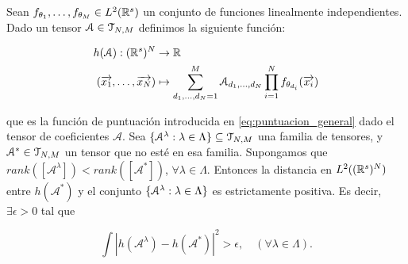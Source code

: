 \begin{lema} \label{lema:lema_previo_corolario}
    Sean $f_{\theta_1}, \ldots, f_{\theta_M} \in L^2(\mathbb{R}^s)$ un conjunto de funciones linealmente independientes. Dado un tensor $\mathcal{A} \in \mathcal{T}_{N, M}$ definimos la siguiente función:

    \begin{equation}
    \begin{split}
        h(\mathcal{A}): (\mathbb{R}^s)^N &\to \mathbb{R} \\
        (\overrightarrow{x_1}, \ldots, \overrightarrow{x_N}) &\mapsto \sum_{d_1, \ldots, d_N = 1}^M \mathcal{A}_{d_1, \ldots, d_N} \prod_{i = 1}^N f_{\theta_{d_i}}(\overrightarrow{x_i})
    \end{split}
    \end{equation}

    que es la función de puntuación introducida en \eqref{eq:puntuacion_general} dado el tensor de coeficientes $\mathcal{A}$. Sea $\{ \mathcal{A}^\lambda: \lambda \in \Lambda \} \subseteq \mathcal{T}_{N, M}$ una familia de tensores, y $\mathcal{A}^* \in \mathcal{T}_{N, M}$ un tensor que no esté en esa familia. Supongamos que $rank([\mathcal{A}^\lambda]) < rank([\mathcal{A}^*])$, $\forall \lambda \in \Lambda$. Entonces la distancia en $L^2((\mathbb{R}^s)^N)$ entre $h(\mathcal{A}^*)$ y el conjunto $\{ \mathcal{A}^\lambda: \lambda \in \Lambda \}$ es estrictamente positiva. Es decir, $\exists \epsilon > 0$ tal que

    \begin{equation}
        \int |h(\mathcal{A}^\lambda) - h(\mathcal{A}^*)|^2 > \epsilon, \quad (\forall \lambda \in \Lambda).
    \end{equation}
\end{lema}

